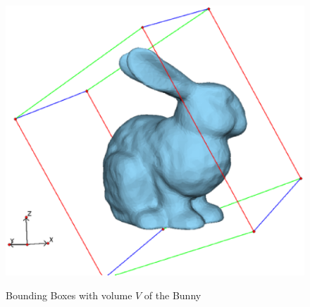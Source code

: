 \documentclass[a4paper,10pt,notitlepage]{scrreprt}
\begin{document}
\begin{figure}
{    \includegraphics[scale=0.4]{bbox-v3-bunny.eps}}
 \caption{Bounding Boxes with volume $V$ of the Bunny}
 \label{fig:bbox-bunny}
\end{figure}
\end{document}
